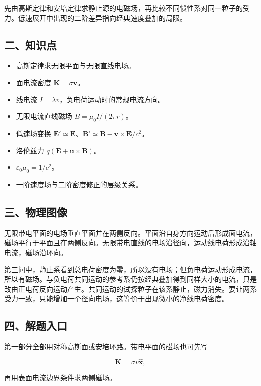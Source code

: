 \documentclass[12pt,a4paper,UTF8]{ctexart}
\newcommand{\tightlist}{\setlength{\itemsep}{0pt}\setlength{\parskip}{0pt}}
\begin{document}
先由高斯定律和安培定律求静止源的电磁场，再比较不同惯性系对同一粒子的受力。低速展开中出现的二阶差异指向经典速度叠加的局限。

\subsection{二、知识点}\label{ux4e8cux77e5ux8bc6ux70b9-5}

\begin{itemize}
\tightlist
\item
  高斯定律求无限平面与无限直线电场。
\item
  面电流密度 \(\bm K=\sigma\bm v\)。
\item
  线电流 \(I=\lambda v\)，负电荷运动时的常规电流方向。
\item
  无限电流直线磁场 \(B=\mu_0I/(2\pi r)\)。
\item
  低速场变换
  \(\bm E'\simeq\bm E\)、\(\bm B'\simeq\bm B-\bm v\times\bm E/c^2\)。
\item
  洛伦兹力 \(q(\bm E+\bm u\times\bm B)\)。
\item
  \(\varepsilon_0\mu_0=1/c^2\)。
\item
  一阶速度场与二阶密度修正的层级关系。
\end{itemize}

\subsection{三、物理图像}\label{ux4e09ux7269ux7406ux56feux50cf-5}

无限带电平面的电场垂直平面并在两侧反向。平面沿自身方向运动后形成面电流，磁场平行于平面且在两侧反向。无限带电直线的电场沿径向，运动线电荷形成沿轴电流，磁场沿环向。

第三问中，静止系看到总电荷密度为零，所以没有电场；但负电荷运动形成电流，所以有磁场。与负电荷共同运动的参考系仍按经典叠加得到同样大小的电流，只是改由正电荷反向运动产生。共同运动的试探粒子在该系静止，磁力消失。要让两系受力一致，只能增加一个径向电场，这等价于出现微小的净线电荷密度。

\subsection{四、解题入口}\label{ux56dbux89e3ux9898ux5165ux53e3-5}

第一部分全部用对称高斯面或安培环路。带电平面的磁场也可先写

\[\bm K=\sigma v\hat{\bm x},\]

再用表面电流边界条件求两侧磁场。
\end{document}
